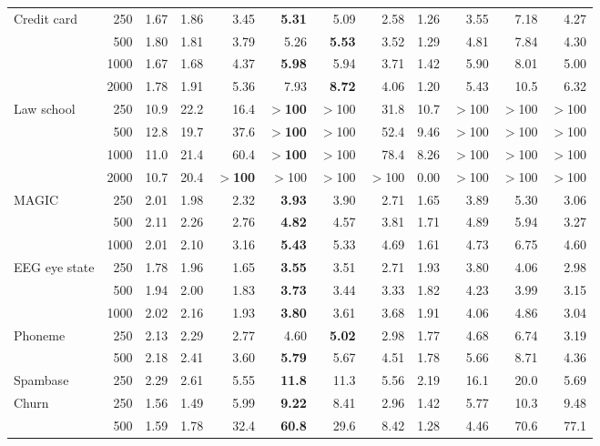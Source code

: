 \documentclass[pdflatex,sn-mathphys-num,iicol]{sn-jnl}
\theoremstyle{thmstyleone}
\theoremstyle{thmstyletwo}
\theoremstyle{thmstylethree}
\begin{document}
\begin{table}[p]
{\begin{tabular}{lrrrrrrrr rrr}
\addlinespace
Credit card & 250 & 1.67 & 1.86 & 3.45 & \textbf{5.31} & 5.09 & 2.58 & 1.26 & 3.55 & 7.18 & 4.27 \\
 & 500 & 1.80 & 1.81 & 3.79 & 5.26 & \textbf{5.53} & 3.52 & 1.29 & 4.81 & 7.84 & 4.30 \\
 & 1000 & 1.67 & 1.68 & 4.37 & \textbf{5.98} & 5.94 & 3.71 & 1.42 & 5.90 & 8.01 & 5.00 \\
 & 2000 & 1.78 & 1.91 & 5.36 & 7.93 & \textbf{8.72} & 4.06 & 1.20 & 5.43 & 10.5 & 6.32 \\
\addlinespace
Law school & 250 & 10.9 & 22.2 & 16.4 & \textbf{$>$100} & $>$100 & 31.8 & 10.7 & $>$100 & $>$100 & $>$100 \\
 & 500 & 12.8 & 19.7 & 37.6 & \textbf{$>$100} & $>$100 & 52.4 & 9.46 & $>$100 & $>$100 & $>$100 \\
 & 1000 & 11.0 & 21.4 & 60.4 & \textbf{$>$100} & $>$100 & 78.4 & 8.26 & $>$100 & $>$100 & $>$100 \\
 & 2000 & 10.7 & 20.4 & \textbf{$>$100} & $>$100 & $>$100 & $>$100 & 0.00 & $>$100 & $>$100 & $>$100 \\
\addlinespace
MAGIC & 250 & 2.01 & 1.98 & 2.32 & \textbf{3.93} & 3.90 & 2.71 & 1.65 & 3.89 & 5.30 & 3.06 \\
 & 500 & 2.11 & 2.26 & 2.76 & \textbf{4.82} & 4.57 & 3.81 & 1.71 & 4.89 & 5.94 & 3.27 \\
 & 1000 & 2.01 & 2.10 & 3.16 & \textbf{5.43} & 5.33 & 4.69 & 1.61 & 4.73 & 6.75 & 4.60 \\
\addlinespace
EEG eye state & 250 & 1.78 & 1.96 & 1.65 & \textbf{3.55} & 3.51 & 2.71 & 1.93 & 3.80 & 4.06 & 2.98 \\
 & 500 & 1.94 & 2.00 & 1.83 & \textbf{3.73} & 3.44 & 3.33 & 1.82 & 4.23 & 3.99 & 3.15 \\
 & 1000 & 2.02 & 2.16 & 1.93 & \textbf{3.80} & 3.61 & 3.68 & 1.91 & 4.06 & 4.86 & 3.04 \\
\addlinespace
Phoneme & 250 & 2.13 & 2.29 & 2.77 & 4.60 & \textbf{5.02} & 2.98 & 1.77 & 4.68 & 6.74 & 3.19 \\
 & 500 & 2.18 & 2.41 & 3.60 & \textbf{5.79} & 5.67 & 4.51 & 1.78 & 5.66 & 8.71 & 4.36 \\
\addlinespace
Spambase & 250 & 2.29 & 2.61 & 5.55 & \textbf{11.8} & 11.3 & 5.56 & 2.19 & 16.1 & 20.0 & 5.69 \\
\addlinespace
Churn & 250 & 1.56 & 1.49 & 5.99 & \textbf{9.22} & 8.41 & 2.96 & 1.42 & 5.77 & 10.3 & 9.48 \\
 & 500 & 1.59 & 1.78 & 32.4 & \textbf{60.8} & 29.6 & 8.42 & 1.28 & 4.46 & 70.6 & 77.1 \\

\end{tabular}}
\end{table}
\end{document}
